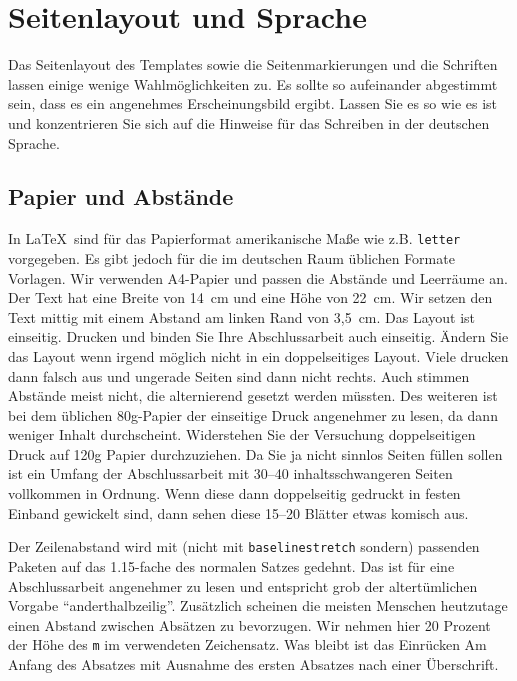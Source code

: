 \documentclass[11pt,a4paper]{report}
\begin{document}
\chapter{Seitenlayout und Sprache} \label{chap:layout}

Das Seitenlayout des Templates sowie die Seitenmarkierungen
und die Schriften lassen einige wenige Wahlmöglichkeiten zu.
Es sollte so aufeinander abgestimmt sein, dass es ein 
angenehmes Erscheinungsbild ergibt.
Lassen Sie es so wie es ist und konzentrieren Sie sich auf
die Hinweise für das Schreiben in der deutschen Sprache.

\section{Papier und Abstände}

In \LaTeX\ sind für das Papierformat amerikanische Maße 
wie z.B. \verb|letter| vor\-ge\-ge\-ben. 
Es gibt jedoch für die im deutschen Raum üblichen Formate Vorlagen. 
Wir verwenden A4-Papier und passen die Abstände und Leerräume an.
Der Text hat eine Breite von 14~cm und eine Höhe von 22~cm.
Wir setzen den Text mittig mit einem Abstand am linken Rand von 
3,5~cm. 
Das Layout ist einseitig.
Drucken und binden Sie Ihre Abschlussarbeit auch einseitig.
Ändern Sie das Layout wenn irgend möglich nicht in ein doppelseitiges 
Layout.
Viele drucken dann falsch aus und ungerade Seiten sind dann nicht 
rechts.
Auch stimmen Abstände meist nicht, die alternierend gesetzt werden
müssten.
Des weiteren ist bei dem üblichen 80g-Papier der einseitige Druck 
angenehmer zu lesen, da dann weniger Inhalt durchscheint. 
Widerstehen Sie der Versuchung doppelseitigen Druck auf 120g Papier
durchzuziehen. 
Da Sie ja nicht sinnlos Seiten füllen sollen ist ein Umfang
der Abschlussarbeit mit 30--40 inhaltsschwangeren Seiten vollkommen 
in Ordnung. 
Wenn diese dann doppelseitig gedruckt in festen Einband gewickelt sind,
dann sehen diese 15--20 Blätter etwas komisch aus. 

Der Zeilenabstand wird mit 
(nicht mit \verb|baselinestretch| sondern) passenden Paketen 
auf das 1.15-fache des normalen Satzes gedehnt. 
Das ist für eine Abschlussarbeit angenehmer zu lesen und
entspricht grob der altertümlichen Vorgabe "`anderthalbzeilig"'.
Zusätzlich scheinen die meisten Menschen heutzutage einen Abstand
zwischen Absätzen zu bevorzugen. 
Wir nehmen hier 20 Prozent der Höhe des \verb|m| im 
verwendeten Zeichensatz.
Was bleibt ist das Einrücken Am Anfang des Absatzes mit Ausnahme des 
ersten Absatzes nach einer Überschrift.
\end{document}
